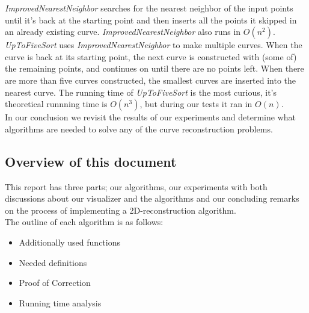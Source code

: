 \textit{ImprovedNearestNeighbor} searches for the nearest neighbor of the input points until it's back at the starting point and then inserts all the points it skipped in an already existing curve. \emph{ImprovedNearestNeighbor} also runs in $O(n^{2})$. \\
 \textit{UpToFiveSort} uses \textit{ImprovedNearestNeighbor} to make multiple curves. When the curve is back at its starting point, the next curve is constructed with (some of) the remaining points, and continues on until there are no points left. When there are more than five curves constructed, the smallest curves are inserted into the nearest curve. The running time of \emph{UpToFiveSort} is the most curious, it's theoretical runnning time is $O(n^{3})$, but during our tests it ran in $O(n)$. \\
In our conclusion we revisit the results of our experiments and determine what algorithms are needed to solve any of the curve reconstruction problems.

\subsection{Overview of this document}
\label{sec:overview_of_this_document}
This report has three parts; our algorithms, our experiments with both discussions about our visualizer and the algorithms and our concluding remarks on the process of implementing a 2D-reconstruction algorithm.\\
The outline of each algorithm is as follows:
\begin{itemize}
    \item Additionally used functions
    \item Needed definitions
    \item Proof of Correction
    \item Running time analysis
\end{itemize} 